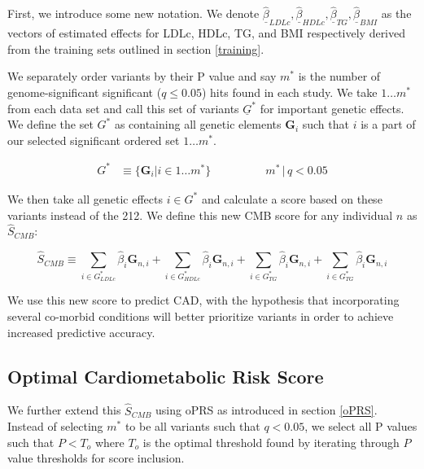 First, we introduce some new notation. We denote $\underline{\hat{\beta}}_{LDLc}, \underline{\hat{\beta}}_{HDLc}, \underline{\hat{\beta}}_{TG}, \underline{\hat{\beta}}_{BMI}$ as the vectors of estimated effects for \ac{LDLc}, \ac{HDLc}, \ac{TG}, and \ac{BMI} respectively derived from the training sets outlined in section \ref{training}.

We separately order variants by their P value and say $m^*$ is the number of genome-significant significant ($q \leq 0.05$) hits found in each study. We take $1 \dots m^*$ from each data set and call this set of variants $\underline{G}^*$ for important genetic effects. We define the set $G^*$ as containing all genetic elements $\mathbf{G}_i$ such that $i$ is a part of our selected significant ordered set $1 \dots m^* $.

$$ \begin{aligned} G^* &\equiv \{ \mathbf{G}_i | i \in 1 \dots m^* \} &&&&&& m^* \, |  \, q < 0.05 \end{aligned}$$


We then take all genetic effects $i \in G^*$ and calculate a score based on these variants instead of the 212. We define this new \ac{CMB} score for any individual $n$ as $\hat{S}_{CMB}$:

$$ \hat{S}_{CMB} \equiv \sum_{i \in G^*_{LDLc}} \hat{\beta}_i \mathbf{G}_{n, i} + \sum_{i \in G^*_{HDLc}} \hat{\beta}_i \mathbf{G}_{n, i} + \sum_{i \in G^*_{TG}} \hat{\beta}_i \mathbf{G}_{n, i} + \sum_{i \in G^*_{TG}} \hat{\beta}_i \mathbf{G}_{n, i} $$

We use this new score to predict \ac{CAD}, with the hypothesis that incorporating several co-morbid conditions will better prioritize variants in order to achieve increased predictive accuracy. 
 


\subsection{Optimal Cardiometabolic Risk Score}

We further extend this $\hat{S}_{CMB}$ using \ac{oPRS} as introduced in section \ref{oPRS}. Instead of selecting $m^*$ to be all variants such that $q < 0.05$, we select all P values such that $P < T_{o}$ where $T_{o}$ is the optimal threshold found by iterating through $P$ value thresholds for score inclusion.

